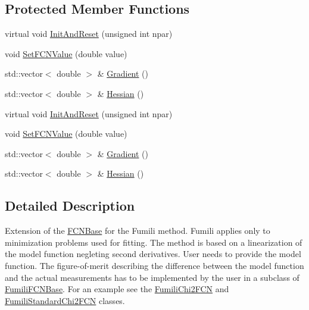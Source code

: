 \subsection*{Protected Member Functions}
\begin{DoxyCompactItemize}
\item 
virtual void \mbox{\hyperlink{classROOT_1_1Minuit2_1_1FumiliFCNBase_a523d4811858adf42922499fa6c2bcdba}{Init\+And\+Reset}} (unsigned int npar)
\item 
void \mbox{\hyperlink{classROOT_1_1Minuit2_1_1FumiliFCNBase_a537ad24d5584bd089c14ee92567ddd72}{Set\+F\+C\+N\+Value}} (double value)
\item 
std\+::vector$<$ double $>$ \& \mbox{\hyperlink{classROOT_1_1Minuit2_1_1FumiliFCNBase_a61cd6d04313bf324c6a226e16017ad4f}{Gradient}} ()
\item 
std\+::vector$<$ double $>$ \& \mbox{\hyperlink{classROOT_1_1Minuit2_1_1FumiliFCNBase_ac90c52050c1f7557834e3fa82c2657f3}{Hessian}} ()
\item 
virtual void \mbox{\hyperlink{classROOT_1_1Minuit2_1_1FumiliFCNBase_a523d4811858adf42922499fa6c2bcdba}{Init\+And\+Reset}} (unsigned int npar)
\item 
void \mbox{\hyperlink{classROOT_1_1Minuit2_1_1FumiliFCNBase_a537ad24d5584bd089c14ee92567ddd72}{Set\+F\+C\+N\+Value}} (double value)
\item 
std\+::vector$<$ double $>$ \& \mbox{\hyperlink{classROOT_1_1Minuit2_1_1FumiliFCNBase_a61cd6d04313bf324c6a226e16017ad4f}{Gradient}} ()
\item 
std\+::vector$<$ double $>$ \& \mbox{\hyperlink{classROOT_1_1Minuit2_1_1FumiliFCNBase_ac90c52050c1f7557834e3fa82c2657f3}{Hessian}} ()
\end{DoxyCompactItemize}


\subsection{Detailed Description}
Extension of the \mbox{\hyperlink{classROOT_1_1Minuit2_1_1FCNBase}{F\+C\+N\+Base}} for the Fumili method. Fumili applies only to minimization problems used for fitting. The method is based on a linearization of the model function negleting second derivatives. User needs to provide the model function. The figure-\/of-\/merit describing the difference between the model function and the actual measurements has to be implemented by the user in a subclass of \mbox{\hyperlink{classROOT_1_1Minuit2_1_1FumiliFCNBase}{Fumili\+F\+C\+N\+Base}}. For an example see the \mbox{\hyperlink{classROOT_1_1Minuit2_1_1FumiliChi2FCN}{Fumili\+Chi2\+F\+CN}} and \mbox{\hyperlink{classROOT_1_1Minuit2_1_1FumiliStandardChi2FCN}{Fumili\+Standard\+Chi2\+F\+CN}} classes.

